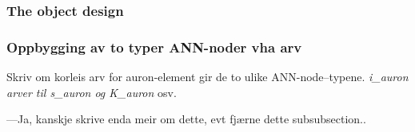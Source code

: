 	\subsubsection{The object design}
%
%

	
	
	\subsubsection{Oppbygging av to typer ANN-noder vha arv}
	Skriv om korleis arv for auron-element gir de to ulike ANN-node--typene. \emph{i\_auron arver til s\_auron og K\_auron} osv.

	---Ja, kanskje skrive enda meir om dette, evt fjærne dette subsubsection..
	



